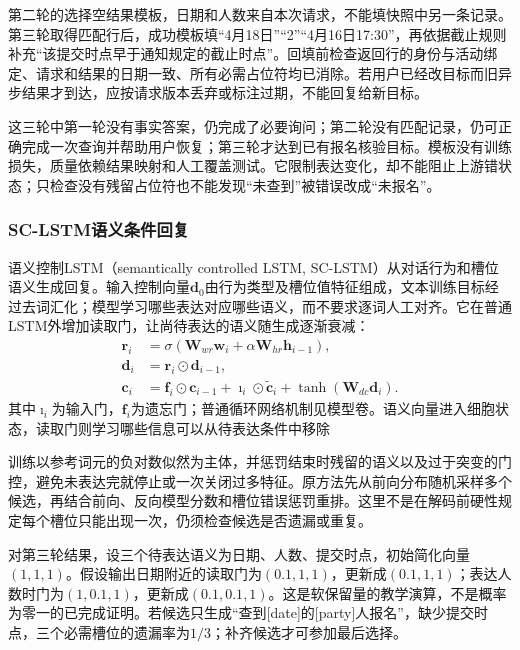 第二轮的选择空结果模板，日期和人数来自本次请求，不能填快照中另一条记录。第三轮取得匹配行后，成功模板填“4月18日”“2”“4月16日17:30”，再依据截止规则补充“该提交时点早于通知规定的截止时点”。回填前检查返回行的身份与活动绑定、请求和结果的日期一致、所有必需占位符均已消除。若用户已经改目标而旧异步结果才到达，应按请求版本丢弃或标注过期，不能回复给新目标。

这三轮中第一轮没有事实答案，仍完成了必要询问；第二轮没有匹配记录，仍可正确完成一次查询并帮助用户恢复；第三轮才达到已有报名核验目标。模板没有训练损失，质量依赖结果映射和人工覆盖测试。它限制表达变化，却不能阻止上游错状态；只检查没有残留占位符也不能发现“未查到”被错误改成“未报名”。

\subsubsection{SC-LSTM语义条件回复}
\label{sec:nlp-dialogue-sclstm}

语义控制LSTM（semantically controlled LSTM, SC-LSTM）从对话行为和槽位语义生成回复。输入控制向量$\bm{d}_0$由行为类型及槽位值特征组成，文本训练目标经过去词汇化；模型学习哪些表达对应哪些语义，而不要求逐词人工对齐。它在普通LSTM外增加读取门，让尚待表达的语义随生成逐渐衰减：
\begin{equation}
\begin{aligned}
 \bm{r}_i&=\sigma(\bm{W}_{wr}\bm{w}_i+
                   \alpha\bm{W}_{hr}\bm{h}_{i-1}),\\
 \bm{d}_i&=\bm{r}_i\odot\bm{d}_{i-1},\\
 \bm{c}_i&=\bm{f}_i\odot\bm{c}_{i-1}
       +\bm{\imath}_i\odot\widetilde{\bm{c}}_i
       +\tanh(\bm{W}_{dc}\bm{d}_i).
\end{aligned}
\label{eq:nlp-dialogue-sclstm}
\end{equation}
其中$\bm{\imath}_i$为输入门，$\bm{f}_i$为遗忘门；普通循环网络机制见模型卷。语义向量进入细胞状态，读取门则学习哪些信息可以从待表达条件中移除

训练以参考词元的负对数似然为主体，并惩罚结束时残留的语义以及过于突变的门控，避免未表达完就停止或一次关闭过多特征。原方法先从前向分布随机采样多个候选，再结合前向、反向模型分数和槽位错误惩罚重排。这里不是在解码前硬性规定每个槽位只能出现一次，仍须检查候选是否遗漏或重复。

对第三轮结果，设三个待表达语义为日期、人数、提交时点，初始简化向量$(1,1,1)$。假设输出日期附近的读取门为$(0.1,1,1)$，更新成$(0.1,1,1)$；表达人数时门为$(1,0.1,1)$，更新成$(0.1,0.1,1)$。这是软保留量的教学演算，不是概率为零一的已完成证明。若候选只生成“查到[date]的[party]人报名”，缺少提交时点，三个必需槽位的遗漏率为$1/3$；补齐候选才可参加最后选择。

